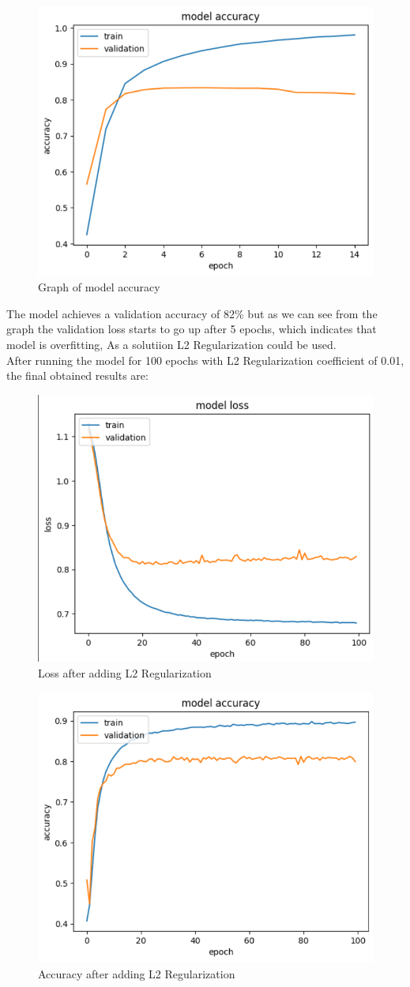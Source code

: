 \documentclass[12pt, a4paper]{article}
\begin{document}
\begin{figure}[H]
    \centering
    \includegraphics[width=0.5\linewidth]{accuracy.png}
    \caption{Graph of model accuracy}
    \label{fig:enter-label}
\end{figure}

The model achieves a validation accuracy of 82\% but as we can see from the graph the validation loss starts to go up after 5 epochs, which indicates that model is overfitting, As a solutiion L2 Regularization could be used. \\ 

After running the model for 100 epochs with L2 Regularization coefficient of 0.01, the final obtained results are: 

\begin{figure}[H]
    \centering
    \includegraphics[width=0.5\linewidth]{l2 loss.png}
    \caption{Loss after adding L2 Regularization}
    \label{fig:enter-label}
\end{figure}

\begin{figure}[H]
    \centering
    \includegraphics[width=0.5\linewidth]{l2 accuracy.png}
    \caption{Accuracy after adding L2 Regularization}
    \label{fig:enter-label}
\end{figure}
\end{document}

